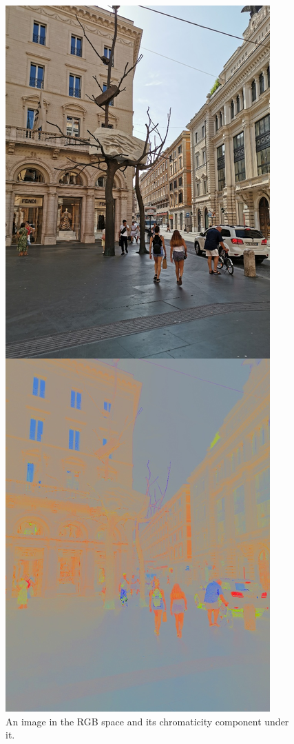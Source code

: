 \documentclass[a4paper,twoside]{article}
\begin{document}
\begin{figure}[!ht]
\setlength{\lineskip}{0pt}
\vspace{-4.0cm}
  \centering
   \includegraphics[scale=0.25,natwidth=684,natheight=1824]{6.jpg} 
  \caption{An image in the RGB space and its chromaticity component under it.}
  \label{fig:example2}
 \end{figure} 
\end{document}
